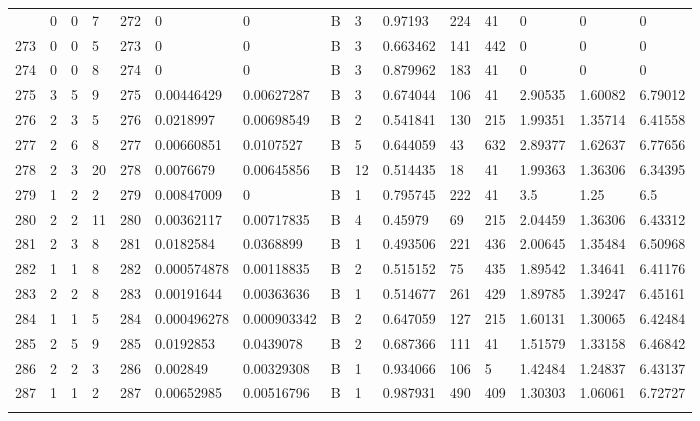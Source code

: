 \begin{latin}
\begin{longtable}{lllllllllllllll}
\begin{comment}
	272 & 0  & 0   & 7  & 272 & 0              & 0              & B & 3  & 0.97193  & 224  & 41   & 0       & 0       & 0       \\
	273 & 0  & 0   & 5  & 273 & 0              & 0              & B & 3  & 0.663462 & 141  & 442  & 0       & 0       & 0       \\
	274 & 0  & 0   & 8  & 274 & 0              & 0              & B & 3  & 0.879962 & 183  & 41   & 0       & 0       & 0       \\
	275 & 3  & 5   & 9  & 275 & 0.00446429     & 0.00627287     & B & 3  & 0.674044 & 106  & 41   & 2.90535 & 1.60082 & 6.79012 \\
	276 & 2  & 3   & 5  & 276 & 0.0218997      & 0.00698549     & B & 2  & 0.541841 & 130  & 215  & 1.99351 & 1.35714 & 6.41558 \\
	277 & 2  & 6   & 8  & 277 & 0.00660851     & 0.0107527      & B & 5  & 0.644059 & 43   & 632  & 2.89377 & 1.62637 & 6.77656 \\
	278 & 2  & 3   & 20 & 278 & 0.0076679      & 0.00645856     & B & 12 & 0.514435 & 18   & 41   & 1.99363 & 1.36306 & 6.34395 \\
	279 & 1  & 2   & 2  & 279 & 0.00847009     & 0              & B & 1  & 0.795745 & 222  & 41   & 3.5     & 1.25    & 6.5     \\
	280 & 2  & 2   & 11 & 280 & 0.00362117     & 0.00717835     & B & 4  & 0.45979  & 69   & 215  & 2.04459 & 1.36306 & 6.43312 \\
	281 & 2  & 3   & 8  & 281 & 0.0182584      & 0.0368899      & B & 1  & 0.493506 & 221  & 436  & 2.00645 & 1.35484 & 6.50968 \\
	282 & 1  & 1   & 8  & 282 & 0.000574878    & 0.00118835     & B & 2  & 0.515152 & 75   & 435  & 1.89542 & 1.34641 & 6.41176 \\
	283 & 2  & 2   & 8  & 283 & 0.00191644     & 0.00363636     & B & 1  & 0.514677 & 261  & 429  & 1.89785 & 1.39247 & 6.45161 \\
	284 & 1  & 1   & 5  & 284 & 0.000496278    & 0.000903342    & B & 2  & 0.647059 & 127  & 215  & 1.60131 & 1.30065 & 6.42484 \\
	285 & 2  & 5   & 9  & 285 & 0.0192853      & 0.0439078      & B & 2  & 0.687366 & 111  & 41   & 1.51579 & 1.33158 & 6.46842 \\
	286 & 2  & 2   & 3  & 286 & 0.002849       & 0.00329308     & B & 1  & 0.934066 & 106  & 5    & 1.42484 & 1.24837 & 6.43137 \\
	287 & 1  & 1   & 2  & 287 & 0.00652985     & 0.00516796     & B & 1  & 0.987931 & 490  & 409  & 1.30303 & 1.06061 & 6.72727 \\

\end{comment}
\end{longtable}
\end{latin}
